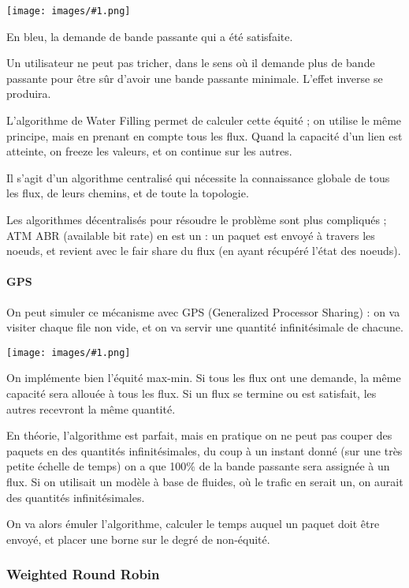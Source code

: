 \documentclass[10pt,a4paper]{report}
\newcommand{\dessin}[1]{\begin{center}\texttt{[image: images/\#1.png]}\end{center}}
\begin{document}
			\dessin{94}
			
			En bleu, la demande de bande passante qui a été satisfaite.
						
			Un utilisateur ne peut pas tricher, dans le sens où il demande plus de bande passante pour être sûr d'avoir une bande passante minimale. L'effet inverse se produira.
			
			L'algorithme de Water Filling permet de calculer cette équité ; on utilise le même principe, mais en prenant en compte tous les flux. Quand la capacité d'un lien est atteinte, on freeze les valeurs, et on continue sur les autres.
			
			Il s'agit d'un algorithme centralisé qui nécessite la connaissance globale de tous les flux, de leurs chemins, et de toute la topologie. 
			
			Les algorithmes décentralisés pour résoudre le problème sont plus compliqués ; ATM ABR (available bit rate) en est un : un paquet est envoyé à travers les noeuds, et revient avec le fair share du flux (en ayant récupéré l'état des noeuds).
			
			\paragraph{GPS}
			
			On peut simuler ce mécanisme avec GPS (Generalized Processor Sharing) : on va visiter chaque file non vide, et on va servir une quantité infinitésimale de chacune.
			
			\dessin{95}
			
			On implémente bien l'équité max-min. Si tous les flux ont une demande, la même capacité sera allouée à tous les flux. Si un flux se termine ou est satisfait, les autres recevront la même quantité.
			
			En théorie, l'algorithme est parfait, mais en pratique on ne peut pas couper des paquets en des quantités infinitésimales, du coup à un instant donné (sur une très petite échelle de temps) on a que 100\% de la bande passante sera assignée à un flux. Si on utilisait un modèle à base de fluides, où le trafic en serait un, on aurait des quantités infinitésimales.
			
			On va alors émuler l'algorithme, calculer le temps auquel un paquet doit être envoyé, et placer une borne sur le degré de non-équité.			
		
			\subsubsection{Weighted Round Robin}
			
\end{document}
